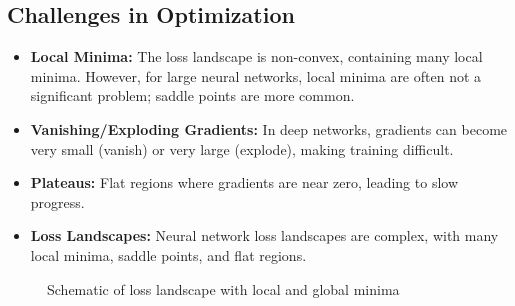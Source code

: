 \subsection{Challenges in Optimization}

\begin{itemize}
    \item \textbf{Local Minima:} The loss landscape is non-convex, containing many local minima. However, for large neural networks, local minima are often not a significant problem; saddle points are more common.
    
    \item \textbf{Vanishing/Exploding Gradients:} In deep networks, gradients can become very small (vanish) or very large (explode), making training difficult.
    
    \item \textbf{Plateaus:} Flat regions where gradients are near zero, leading to slow progress.
    
    \item \textbf{Loss Landscapes:} Neural network loss landscapes are complex, with many local minima, saddle points, and flat regions.
\end{itemize}

\begin{figure}[h]
    \centering
    \caption{Schematic of loss landscape with local and global minima}
    \label{fig:loss_landscape}
\end{figure}

